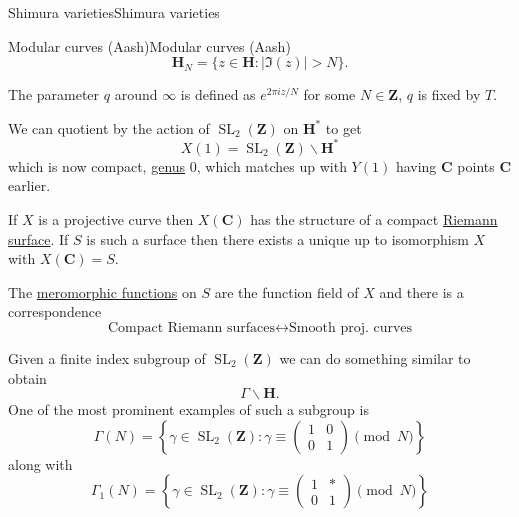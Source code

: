 \documentclass[10pt,]{book}
\numberwithin{equation}{section}
\newcommand{\ZZ}{\mathbf{Z}}
\newcommand{\CC}{\mathbf{C}}
\newcommand{\HH}{\mathbf{H}}
\DeclareMathOperator{\SL}{SL}
\newcommand{\gt}{>}
\newcommand{\amp}{&}
\begin{document}
\begin{chapterptx}{Shimura varieties}{}{Shimura varieties}{}{}
\begin{sectionptx}{Modular curves (Aash)}{}{Modular curves (Aash)}{}{}
\begin{equation*}
\HH_N = \{ z\in \HH : | \Im(z)| \gt N\}\text{.}
\end{equation*}
%
\par
\hypertarget{p-1032}{}%
The parameter \(q\) around \(\infty\) is defined as \(e^{2\pi i z/N}\) for some \(N\in \ZZ\), \(q\) is fixed by \(T\).%
\par
\hypertarget{p-1033}{}%
We can quotient by the action of \(\SL_2(\ZZ) \) on \(\HH^*\) to get%
\begin{equation*}
X(1) = \SL_2(\ZZ) \backslash \HH^*
\end{equation*}
which is now compact, \hyperref[def-class-set]{genus} 0, which matches up with \(Y(1)\) having \(\CC\) points \(\CC\) earlier.%
\par
\hypertarget{p-1034}{}%
If \(X\) is a projective curve then \(X(\CC)\) has the structure of a compact \hyperref[def-top-riem-surface]{Riemann surface}. If \(S\) is such a surface then there exists a unique up to isomorphism \(X\) with \(X(\CC) = S\).%
\par
\hypertarget{p-1035}{}%
The \hyperref[def-morph-riem-surf]{meromorphic functions} on \(S\) are the function field of \(X\) and there is a correspondence%
\begin{equation*}
\text{Compact Riemann surfaces} \leftrightarrow \text{Smooth proj. curves}
\end{equation*}
%
\par
\hypertarget{p-1036}{}%
Given a finite index subgroup of \(\SL_2(\ZZ)\) we can do something similar to obtain%
\begin{equation*}
\Gamma\backslash \HH\text{.}
\end{equation*}
One of the most prominent examples of such a subgroup is%
\begin{equation*}
\Gamma(N) = \left\{ \gamma \in \SL_2(\ZZ) : \gamma \equiv \begin{pmatrix} 1\amp0 \\ 0 \amp 1 \end{pmatrix} \pmod N \right\}
\end{equation*}
along with%
\begin{equation*}
\Gamma_1(N) = \left\{ \gamma \in \SL_2(\ZZ) : \gamma \equiv \begin{pmatrix} 1\amp\ast \\ 0 \amp 1 \end{pmatrix} \pmod N \right\}
\end{equation*}
%
\begin{equation*}

\end{equation*}
\end{sectionptx}
\end{chapterptx}
\end{document}
